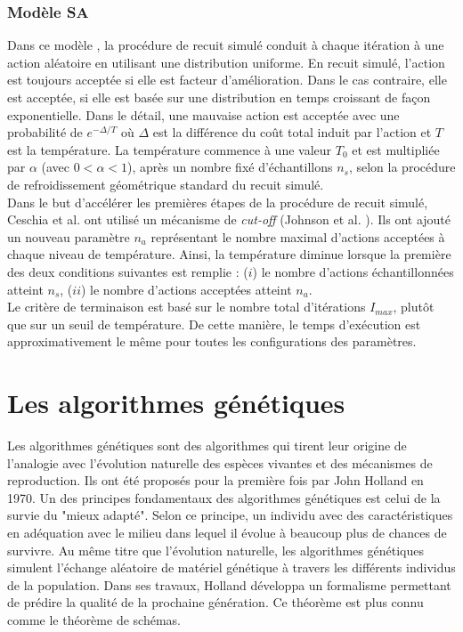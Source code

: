 		\subsubsection{Modèle SA}
		Dans ce modèle \cite{ceschia}, la procédure de recuit simulé conduit à chaque itération à une action aléatoire en utilisant une distribution uniforme. En recuit simulé, l'action est toujours acceptée si elle est facteur d'amélioration. Dans le cas contraire, elle est acceptée, si elle est basée sur une distribution en temps croissant de façon exponentielle. Dans le détail, une mauvaise action est acceptée avec une probabilité de $e^{-\Delta/T}$ où $\Delta$ est la différence du coût total induit par l'action et $T$ est la température. La température commence à une valeur $T_{0}$ et est multipliée par $\alpha$ (avec $0 < \alpha < 1$), après un nombre fixé d'échantillons $n_{s}$, selon la procédure de refroidissement géométrique standard du recuit simulé. \\
		\hspace*{.5cm} Dans le but d'accélérer les premières étapes de la procédure de recuit simulé,  Ceschia et al.\cite{ceschia} ont utilisé un mécanisme de \emph{cut-off} (Johnson et al. \cite{johnson}). Ils ont ajouté un nouveau paramètre $n_{a}$ représentant le nombre maximal d'actions acceptées à chaque niveau de température. Ainsi, la température diminue lorsque la première des deux conditions suivantes est remplie : ($i$) le nombre d'actions échantillonnées atteint $n_{s}$, ($ii$) le nombre d'actions acceptées atteint $n_{a}$. \\
		\hspace*{.5cm} Le critère de terminaison est basé sur le nombre total d'itérations $I_{max}$, plutôt que sur un seuil de température. De cette manière, le temps d'exécution est approximativement le même pour toutes les configurations des paramètres.
		
	\section{Les algorithmes génétiques}
		
	Les algorithmes génétiques sont des algorithmes qui tirent leur origine de l'analogie avec l'évolution naturelle des espèces vivantes et des mécanismes de reproduction. Ils ont été proposés pour la première fois par John Holland \cite{holland1} en 1970. Un des principes fondamentaux des algorithmes génétiques est celui de la survie du "mieux adapté". Selon ce principe, un individu avec des caractéristiques en adéquation avec le milieu dans lequel il évolue à beaucoup plus de chances de survivre. Au même titre que l'évolution naturelle, les algorithmes génétiques simulent l'échange aléatoire de matériel génétique à travers les différents individus de la population. Dans ses travaux, Holland développa un formalisme permettant de prédire la qualité de la prochaine génération. Ce théorème est plus connu comme le théorème de schémas.  
	
